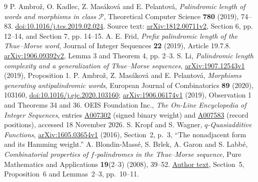 \documentclass[11pt]{article}
\begin{document}
\begin{thebibliography}{9}
\small\setlength{\itemsep}{1pt}
 P. Ambro\v{z}, O. Kadlec, Z. Mas\'akov\'a and E. Pelantov\'a,
\emph{Palindromic length of words and morphisms in class $\mathcal P$},
Theoretical Computer Science \textbf{780} (2019), 74--83.
\href{https://doi.org/10.1016/j.tcs.2019.02.024}{doi:10.1016/j.tcs.2019.02.024}.
Source text: \href{https://arxiv.org/abs/1812.00711v2}{arXiv:1812.00711v2},
Section 6, pp. 12--14, and Section 7, pp. 14--15.
 A. E. Frid, \emph{Prefix palindromic length of the Thue--Morse
word}, Journal of Integer Sequences \textbf{22} (2019), Article 19.7.8.
\href{https://arxiv.org/abs/1906.09392v2}{arXiv:1906.09392v2},
Lemma 3 and Theorem 4, pp. 2--3.
 S. Li, \emph{Palindromic length complexity and a generalization
of Thue--Morse sequences},
\href{https://arxiv.org/abs/1907.12543v1}{arXiv:1907.12543v1} (2019),
Proposition 1.
 P. Ambro\v{z}, Z. Mas\'akov\'a and E. Pelantov\'a,
\emph{Morphisms generating antipalindromic words},
European Journal of Combinatorics \textbf{89} (2020), 103160,
\href{https://doi.org/10.1016/j.ejc.2020.103160}{doi:10.1016/j.ejc.2020.103160};
\href{https://arxiv.org/abs/1906.06174v1}{arXiv:1906.06174v1} (2019),
Observation 1 and Theorems 34 and 36.
 OEIS Foundation Inc., \emph{The On-Line Encyclopedia of
Integer Sequences}, entries \href{https://oeis.org/A007302}{A007302}
(signed binary weight) and \href{https://oeis.org/A007583}{A007583}
(record positions), accessed 18 November 2026.
 S. Kropf and S. Wagner, \emph{$q$-Quasiadditive Functions},
\href{https://arxiv.org/abs/1605.03654v1}{arXiv:1605.03654v1} (2016),
Section~2, p.~3, ``The nonadjacent form and its Hamming weight.''
 A. Blondin-Mass\'e, S. Brlek, A. Garon and S. Labb\'e,
\emph{Combinatorial properties of $f$-palindromes in the Thue--Morse sequence},
Pure Mathematics and Applications \textbf{19}(2--3) (2008), 39--52.
\href{https://www.slabbe.org/Publications/2008-ThueMorseLacunas.pdf}{Author text},
Section~5, Proposition~6 and Lemmas~2--3, pp.~10--11.
\end{thebibliography}
\end{document}

